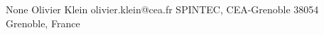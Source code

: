 \begin{conf-abstract}[]
{None}
{\color{blue} Olivier Klein}
{olivier.klein@cea.fr}
{SPINTEC, CEA-Grenoble 38054 Grenoble, France}
{\decofourleft \decofourright}





\printbibliography[heading=none]

\end{conf-abstract}
